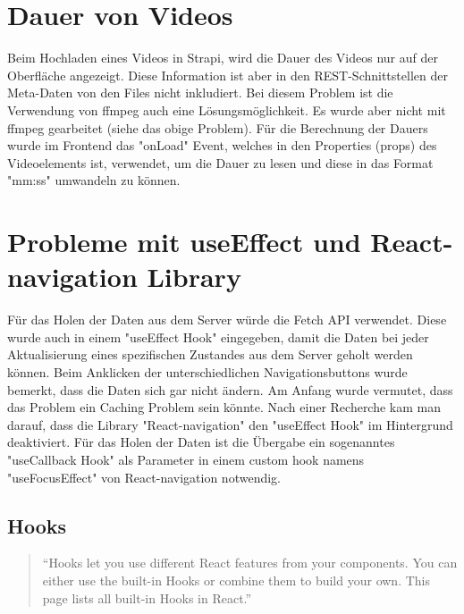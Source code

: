\begin{spacing}{1}
    \section{Dauer von Videos}\label{sec:dauer-von-videos}

    Beim Hochladen eines Videos in Strapi,
    wird die Dauer des Videos nur auf der Oberfläche angezeigt.
    Diese Information ist aber in den REST-Schnittstellen der Meta-Daten von den Files nicht inkludiert.
    Bei diesem Problem ist die Verwendung von ffmpeg auch eine Lösungsmöglichkeit.
    Es wurde aber nicht mit ffmpeg gearbeitet (siehe das obige Problem).
    Für die Berechnung der Dauers wurde im Frontend das "onLoad" Event,
    welches in den Properties (props) des Videoelements ist, verwendet,
    um die Dauer zu lesen und diese in das Format "mm:ss" umwandeln zu können.





    \section{Probleme mit useEffect und React-navigation Library}\label{sec:probleme-mit-useeffect-und-react-navigation-library}
    Für das Holen der Daten aus dem Server würde die Fetch API verwendet.
    Diese wurde auch in einem "useEffect Hook" eingegeben, damit die Daten bei jeder Aktualisierung eines spezifischen
    Zustandes aus dem Server geholt werden können.
    Beim Anklicken der unterschiedlichen Navigationsbuttons wurde bemerkt,
    dass die Daten sich gar nicht ändern.
    Am Anfang wurde vermutet, dass das Problem ein Caching Problem sein könnte.
    Nach einer Recherche kam man darauf, dass die Library "React-navigation" den "useEffect Hook" im Hintergrund deaktiviert.
    Für das Holen der Daten ist die Übergabe ein sogenanntes "useCallback Hook" als Parameter in einem custom hook namens "useFocusEffect"
    von React-navigation notwendig.\cite{issuesWithUseEffect}


    \subsection{Hooks}\label{subsec:hooks}
    \begin{quotation}
        ``Hooks let you use different React features from your components.
        You can either use the built-in Hooks or combine them to build your own.
        This page lists all built-in Hooks in React.''
        \cite{hooks}
    \end{quotation}


\end{spacing}
